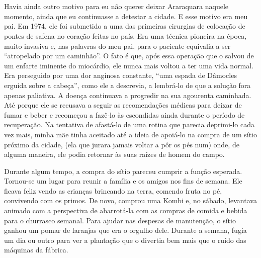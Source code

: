 \chapter{}

Havia ainda outro motivo para eu não querer deixar Araraquara naquele momento, ainda que eu continuasse a detestar a cidade.
E esse motivo era  meu pai.
Em 1974, ele foi submetido a uma das primeiras cirurgias de colocação de pontes de safena no coração feitas no país.
Era uma técnica pioneira na época, muito invasiva e, nas palavras do meu pai, para o paciente equivalia a ser “atropelado por um caminhão”.
O fato é que, após essa operação que o salvou de um enfarte iminente do miocárdio, ele nunca mais voltou a ter uma vida normal.
Era perseguido por uma dor anginosa constante, “uma espada de Dâmocles erguida sobre a cabeça”, como ele a descrevia, a lembrá-lo de que a solução fora apenas paliativa.
A doença continuava a progredir na sua agourenta caminhada.
Até porque ele se recusava a seguir as recomendações médicas para deixar de fumar e beber e recomeçou a fazê-lo às escondidas ainda durante o período de recuperação.
 Na tentativa de afastá-lo de uma rotina que parecia deprimi-lo cada vez mais, minha mãe tinha aceitado até a ideia de apoiá-lo na compra de um sítio próximo da cidade, (ela que jurara jamais voltar a pôr os pés num) onde, de alguma maneira, ele podia retornar às suas raízes de homem do campo.

Durante algum tempo, a compra do sítio pareceu cumprir a função esperada.
Tornou-se um lugar para reunir a família e os amigos nos fins de semana.
Ele ficava feliz vendo as crianças brincando na terra, comendo fruta no pé, convivendo com os primos.
De novo, comprou uma Kombi e, no sábado, levantava animado com a perspectiva de abarrotá-la com as compras de comida e bebida para o churrasco semanal.
Para ajudar nas despesas de manutenção, o sítio ganhou um pomar de laranjas que era o orgulho dele.
 Durante a semana, fugia um dia ou outro para ver a plantação que o divertia bem mais que o ruído das máquinas da fábrica.

